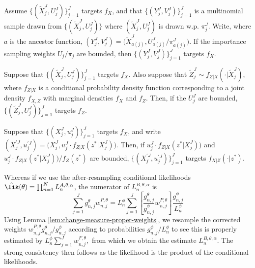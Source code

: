 \documentclass[9pt,twoside,lineno]{pnas-new}
\begin{document}
\begin{lem}
    \label{lem:change-measure-proper-weights}
    Assume $\{(\tilde X_j^J,U_j^J)\}_{j=1}^J$ targets $f_X$, and that $\{(Y_j^J,V_j^J)\}_{j=1}^J$ is a multinomial sample drawn from $\{(\tilde X_j^J,U_j^J)\}$ where $(\tilde X_j^J,U_j^J)$ is drawn w.p. $\pi^J_j$. Write, where $a$ is the ancestor function,
    $(Y_j^J,V_j^J) = \big(\tilde X^J_{a(j)},U^J_{a(j)}/\pi^J_{a(j)}\big)
    $. If the importance sampling weights $U_j/\pi_j$ are bounded, then $\{(Y^J_j,V^J_j)\}_{j=1}^J$ targets $f_X$.
\end{lem}
\begin{lem}
    \label{lem:marginal-proper-weights}
    Suppose that $\{(\tilde X_j^J,U_j^J)\}_{j=1}^J$ targets $f_X$. Also suppose that $\tilde Z_j^J \sim f_{Z|X}(\cdot | \tilde X_j^J)$, where $f_{Z|X}$ is a conditional probability density function corresponding to a joint density $f_{X,Z}$ with marginal densities $f_X$ and $f_Z$. Then, if the $U_j^J$ are bounded, $\{(\tilde Z_j^J,U_j^J)\}_{j=1}^J$ targets $f_Z$.
\end{lem}
\begin{lem}
    \label{lem:posterior-proper-weights}
    Suppose that $\{(X_j^J,u_j^J)\}_{j=1}^J$ targets $f_X$, and write $(X^{\prime J}_j,u^{\prime J}_j) = \big(X_j^J,u_j^J \cdot f_{Z|X}(z^*|X_j^J)\big)$. Then, if $u_j^J \cdot f_{Z|X}(z^*|X_j^J)\big)$ and $u_j^J \cdot f_{Z|X}(z^*|X_j^J)\big) / f_Z(z^*)$ are bounded, $\{(X^{\prime J}_j,u^{\prime J}_j)\}_{j=1}^J$ targets $f_{X|Z}(\cdot | z^*)$.
\end{lem}
    
Whereas if we use the after-resampling conditional likelihoods $\hat\lik(\theta) = \prod_{n=1}^N L_n^{A,\theta,\alpha}$, the numerator of $L_n^{B,\theta,\alpha}$ is
\begin{equation}
    \sum_{j=1}^J g_{n,j}^\theta w_{n, j}^{P, \theta} = L^\phi_n \sum_{j=1}^J \left[ \frac{g^\theta_{n,j}}{g^\phi_{n,j}} w^{P,\theta}_{n,j}\right] \frac{g^\phi_{n,j}}{L_n^\phi}
\end{equation}
Using Lemma \ref{lem:change-measure-proper-weights}, we resample the corrected weights $w^{P,\theta}_{n,j}{g^\theta_{n,j}}/{g^\phi_{n,j}} $ according to probabilities ${g^\phi_{n,j}}/{L_n^\phi}$ to see this is properly estimated by $L^\phi_n \sum_{j=1}^J w^{F,\theta}_{n,j},$
from which we obtain the estimate $L_n^{B,\theta,\alpha}$. The strong consistency then follows as the likelihood is the product of the conditional likelihoods.
\end{document}
